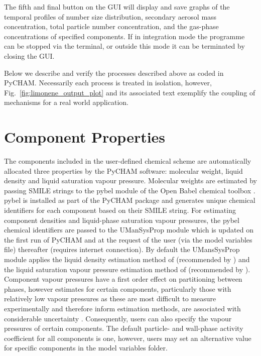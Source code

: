 \documentclass[gmd, manuscript]{copernicus}
\begin{document}
The fifth and final button on the GUI will display and save graphs of the temporal profiles of number size distribution, secondary aerosol mass concentration, total particle number concentration, and the gas-phase concentrations of specified components.  If in integration mode the programme can be stopped via the terminal, or outside this mode it can be terminated by closing the GUI.

Below we describe and verify the processes described above as coded in PyCHAM.  Necessarily each process is treated in isolation, however, Fig.~\ref{fig:limonene_output_plot} and its associated text exemplify the coupling of mechanisms for a real world application.

\section{Component Properties}\label{sec:prop}

The components included in the user-defined chemical scheme are automatically allocated three properties by the PyCHAM software: molecular weight, liquid density and liquid saturation vapour pressure.  Molecular weights are  estimated by passing SMILE strings to the pybel module of the Open Babel chemical toolbox \citep{OBoyle2011}.  pybel is installed as part of the PyCHAM package and generates unique chemical identifiers for each component based on their SMILE string.  For estimating component densities and liquid-phase saturation vapour pressures, the pybel chemical identifiers are passed to the UManSysProp module \citep{Topping2016} which is updated on the first run of PyCHAM and at the request of the user (via the model variables file) thereafter (requires internet connection).  By default the UMansSysProp module applies the liquid density estimation method of \citet{Girolami1994} (recommended by \citet{Barley2013}) and the liquid saturation vapour pressure estimation method of \citet{Nannoolal2008} (recommended by \citet{OMeara2014}).  Component vapour pressures have a first order effect on partitioning between phases, however estimates for certain components, particularly those with relatively low vapour pressures as these are most difficult to measure experimentally and therefore inform estimation methods,  are associated with considerable uncertainty \citep{OMeara2014}.  Consequently, users can also specify the vapour pressures of certain components.  The default particle- and wall-phase activity coefficient for all components is one, however, users may set an alternative value for specific components in the model variables folder.
\end{document}
